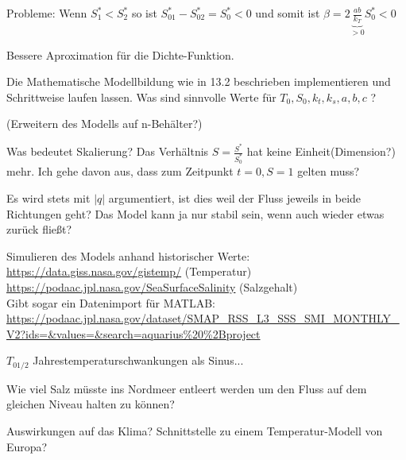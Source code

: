 \documentclass[11pt,a4paper]{article}
\begin{document}
	Probleme:
	Wenn \(S^*_1 < S^*_2\) so ist \(S^*_01 - S^*_02 = S^*_0 < 0\) und somit ist \(\beta = 2\underbrace{\frac{ab}{k_T}}_{>0}S^*_0 < 0\)

	Bessere Aproximation für die Dichte-Funktion.
	
	Die Mathematische Modellbildung wie in 13.2 beschrieben implementieren und Schrittweise laufen lassen. Was sind sinnvolle Werte für \( T_0, S_0, k_t, k_s,  a, b, c\) ?

	(Erweitern des Modells auf n-Behälter?)

	Was bedeutet Skalierung?	 Das Verhältnis \( S = \frac{S^*}{S^*_0} \) hat keine Einheit(Dimension?) mehr. Ich gehe davon aus, dass zum Zeitpunkt \( t=0, S=1 \) gelten muss?
	
	Es wird stets mit \( |q| \) argumentiert, ist dies weil der Fluss jeweils in beide Richtungen geht? Das Model kann ja nur stabil sein, wenn auch wieder etwas zurück fließt?
	
	Simulieren des Models anhand historischer Werte: \\
	\url{https://data.giss.nasa.gov/gistemp/} (Temperatur) \\
	\url{https://podaac.jpl.nasa.gov/SeaSurfaceSalinity} (Salzgehalt) \\
	Gibt sogar ein Datenimport für MATLAB: \url{https://podaac.jpl.nasa.gov/dataset/SMAP_RSS_L3_SSS_SMI_MONTHLY_V2?ids=&values=&search=aquarius%20%2Bproject}
	
	\( T_{0 1/2} \) Jahrestemperaturschwankungen als Sinus...
	
	Wie viel Salz müsste ins Nordmeer entleert werden um den Fluss auf dem gleichen Niveau halten zu können?
	
	Auswirkungen auf das Klima? Schnittstelle zu einem Temperatur-Modell von Europa?
	
\end{document}

